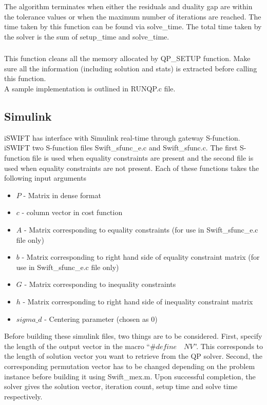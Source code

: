 \documentclass[10pt]{article}
\begin{document}
The algorithm terminates when either the residuals and duality gap are within the tolerance values or when the maximum number of iterations are reached. The time taken by this function can be found via solve\_time. The total time taken by the solver is the sum of setup\_time and solve\_time.

\subsubsection{}
This function cleans all the memory allocated by QP\_SETUP function. Make sure all the information (including solution and stats) is extracted before calling this function. \\

A sample implementation is outlined in RUNQP.c file.

\subsection{Simulink}
 iSWIFT has interface with Simulink real-time through gateway S-function. iSWIFT two S-function files Swift\_sfunc\_e.c and Swift\_sfunc.c. The first S-function file is used when equality constraints are present and the second file is used when equality constraints are not present. Each of these functions takes the following input arguments
 \begin{itemize}
 	\setlength{\itemsep}{1pt}%
 	\setlength{\parskip}{0pt}%
 	\item $P$ - Matrix in dense format
 	\item $c$ - column vector in cost function
 	\item $A$ - Matrix corresponding to equality constraints (for use in Swift\_sfunc\_e.c file only)
 	\item $b$ - Matrix corresponding to right hand side of equality constraint matrix (for use in Swift\_sfunc\_e.c file only)
 	\item $G$ - Matrix corresponding to inequality constraints
 	\item $h$ - Matrix corresponding to right hand side of inequality constraint matrix
 	\item $sigma\_d$ - Centering parameter (chosen as $0$)
 \end{itemize}
	Before building these simulink files, two things are to be considered. First, specify the length of the output vector in the macro ``$\#define \quad NV$''. This corresponds to the length of solution vector you want to retrieve from the QP solver. Second, the corresponding permutation vector has to be changed depending on the problem instance before building it using Swift\_mex.m. Upon successful completion, the solver gives the solution vector, iteration count, setup time and solve time respectively.
\end{document}
